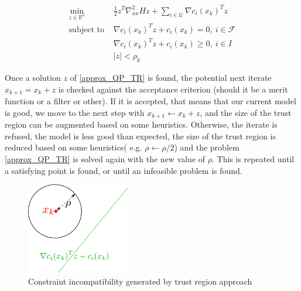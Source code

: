 \begin{equation}
  \begin{array}{ll}
    \min\limits_{z\in \mathbb{R}^n}{} & \frac{1}{2}z^T\nabla_{xx}^2Hz + \sum_{i\in\mathcal{U}}\nabla c_i(x_k)^Tz \\
    \text{subject to } & \nabla c_i(x_k)^Tz+c_i(x_k)=0,\ i\in \mathcal{F} \\
                       & \nabla c_i(x_k)^Tz+c_i(x_k)\geq 0,\ i\in I\\
                       & |z|<\rho_k
  \end{array}
  \label{approx_QP_TR}
\end{equation}

Once a solution $z$ of \ref{approx_QP_TR} is found, the potential next iterate $x_{k+1} = x_k + z$ is checked against the acceptance criterion (should it be a merit function or a filter or other).
If it is accepted, that means that our current model is good, we move to the next step with $x_{k+1} \leftarrow x_k + z$, and the size of the trust region can be augmented based on some heuristics.
Otherwise, the iterate is refused, the model is less good than expected, the size of the trust region is reduced based on some heuristics( e.g. $\rho\leftarrow\rho/2$) and the problem \ref{approx_QP_TR} is solved again with the new value of $\rho$.
This is repeated until a satisfying point is found, or until an infeasible problem is found.

\begin{figure}[ht]
  \centering
  \includegraphics[width=0.4\textwidth]{trust_region_incompatible.pdf}
  \caption{Constraint incompatibility generated by trust region approach}
  \label{fig:TR_incompatible}
\end{figure}

